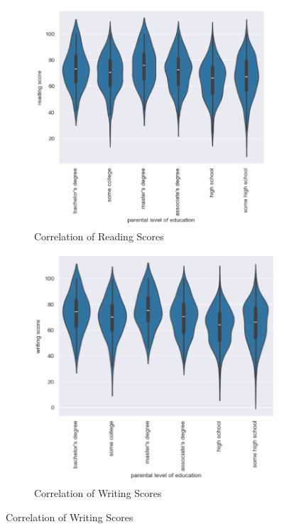 \documentclass[man,12pt]{apa6} %
\begin{document}
\begin{figure}[h!]
\begin{subfigure}{0.3\textwidth}
    \includegraphics[width=\linewidth]{ReadingVsParent.png}
    \caption{Correlation of Reading Scores}
    \label{fig:view}
    \end{subfigure}
    \begin{subfigure}{0.3\textwidth}
    \includegraphics[width=\linewidth]{WritingVsParent.png}
    \caption{Correlation of Writing Scores}
    \label{fig:view}
    \end{subfigure}
\end{figure}
\end{document}
